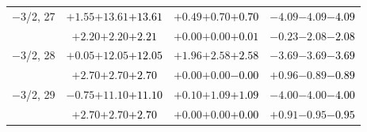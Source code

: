 \documentclass[compress]{beamer}
\begin{document}
\begin{frame}
\begin{tabular}{r | c | c | c}
$-$3/2, 27 & $+1.55$\hspace{0.1 cm}$+13.61$\hspace{0.1 cm}\textcolor{black}{$+13.61$} & $+0.49$\hspace{0.1 cm}$+0.70$\hspace{0.1 cm}\textcolor{black}{$+0.70$} & $-4.09$\hspace{0.1 cm}$-4.09$\hspace{0.1 cm}\textcolor{black}{$-4.09$} \\
           & $+2.20$\hspace{0.1 cm}$+2.20$\hspace{0.1 cm}\textcolor{black}{$+2.21$} & $+0.00$\hspace{0.1 cm}$+0.00$\hspace{0.1 cm}\textcolor{black}{$+0.01$} & $-0.23$\hspace{0.1 cm}$-2.08$\hspace{0.1 cm}\textcolor{black}{$-2.08$} \\
$-$3/2, 28 & $+0.05$\hspace{0.1 cm}$+12.05$\hspace{0.1 cm}\textcolor{black}{$+12.05$} & $+1.96$\hspace{0.1 cm}$+2.58$\hspace{0.1 cm}\textcolor{black}{$+2.58$} & $-3.69$\hspace{0.1 cm}$-3.69$\hspace{0.1 cm}\textcolor{black}{$-3.69$} \\
           & $+2.70$\hspace{0.1 cm}$+2.70$\hspace{0.1 cm}\textcolor{black}{$+2.70$} & $+0.00$\hspace{0.1 cm}$+0.00$\hspace{0.1 cm}\textcolor{black}{$-0.00$} & $+0.96$\hspace{0.1 cm}$-0.89$\hspace{0.1 cm}\textcolor{black}{$-0.89$} \\
$-$3/2, 29 & $-0.75$\hspace{0.1 cm}$+11.10$\hspace{0.1 cm}\textcolor{black}{$+11.10$} & $+0.10$\hspace{0.1 cm}$+1.09$\hspace{0.1 cm}\textcolor{black}{$+1.09$} & $-4.00$\hspace{0.1 cm}$-4.00$\hspace{0.1 cm}\textcolor{black}{$-4.00$} \\
           & $+2.70$\hspace{0.1 cm}$+2.70$\hspace{0.1 cm}\textcolor{black}{$+2.70$} & $+0.00$\hspace{0.1 cm}$+0.00$\hspace{0.1 cm}\textcolor{black}{$+0.00$} & $+0.91$\hspace{0.1 cm}$-0.95$\hspace{0.1 cm}\textcolor{black}{$-0.95$} \\

\end{tabular}
\end{frame}
\end{document}
